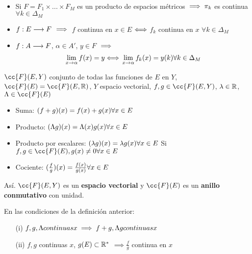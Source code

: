 \begin{prop}\\
    \begin{itemize}
        \item Si $F=F_1\times...\times F_M$ es un producto de espacios métricos $\implies  \pi_k$ es continua $\forall k \in \Delta_M$
        \item $f:E \longrightarrow F$ $\implies$ $f$ continua en $x\in E$ $\Longleftrightarrow$ $f_k$ continua en $x$ $\forall k \in \Delta_M$
        \item $f:A\longrightarrow F$, $\alpha \in A'$, $y\in F$ $\implies$ 
        $$\lim_{x\to\alpha} f(x) = y \\ \Longleftrightarrow \\ \lim_{x\to\alpha} f_k(x) = y(k)\\  \forall k \in \Delta_M$$
    \end{itemize}
\end{prop}

\begin{definicion}
    $\cc{F}(E,Y)$ conjunto de todas las funciones de $E$ en $Y$, $\cc{F}(E) = \cc{F}(E,\R)$, 
    $Y$ espacio vectorial, $f,g \in \cc{F}(E,Y)$, $\lambda \in \mathbb R$, $\Lambda \in \cc{F}(E)$
    \begin{itemize}
        \item Suma: $(f+g)(x) = f(x) + g(x)\\ \forall x \in E$
        \item Producto: $(\Lambda g)(x) = \Lambda(x) g(x) \\\forall x \in E$
        \item Producto por escalares: $(\lambda g)(x) = \lambda g(x) \\\forall x \in E$ \newline\newline
        Si $f, g \in \cc{F}(E), g(x) \neq 0 \\\forall x \in E$
        \item Cociente: $(\frac{f}{g})(x) = \frac{f(x)}{g(x)} \\\forall x \in E$
    \end{itemize}

    Así. $\cc{F}(E,Y)$ es un \textbf{espacio vectorial} y $\cc{F}(E)$ es un \textbf{anillo conmutativo} con unidad.
\end{definicion}

\begin{prop}
    En las condiciones de la definición anterior:
    \begin{itemize}
        \item[(i)] $f,g,\Lambda \\ continuas \\ x \implies f+g, \Lambda g \\ continuas \\ x$
        \item[(ii)] $f,g$ continuas $x$, $g(E) \subset \mathbb R ^*$ $\implies \frac{f}{g}$ continua en $x$ 
    \end{itemize}
\end{prop}

